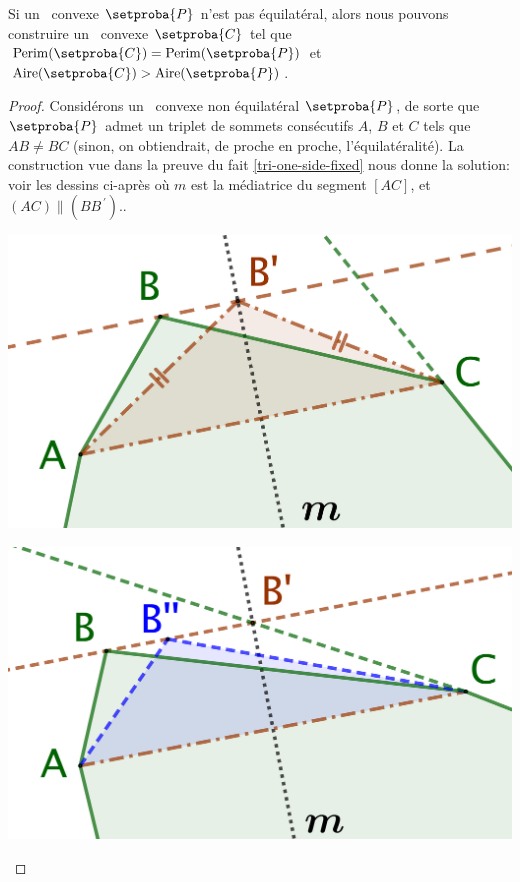 

\begin{fact} \label{must-be-equi}
	Si un \ngone\ convexe $\setproba{P}$ n'est pas équilatéral,
	alors nous pouvons construire un \ngone\ convexe $\setproba{C}$ tel que
	$\perim{\setproba{C}} = \perim{\setproba{P}}$
	et
	$\area{\setproba{C}} > \area{\setproba{P}}$.
\end{fact}


\begin{proof}
	Considérons un \ngone\ convexe non équilatéral $\setproba{P}$,
	de sorte que $\setproba{P}$ admet un triplet de sommets consécutifs $A$, $B$ et $C$ tels que $AB \neq BC$
	(sinon, on obtiendrait, de proche en proche, l'équilatéralité).
	La construction vue dans la preuve du fait \ref{tri-one-side-fixed} nous donne la solution: voir les dessins ci-après où 
	$m$ est la médiatrice du segment $[AC]$,
	et
	$(AC) \parallel (BB^{\,\prime})$..
	\begin{multicols}{2}
		\centering

		\includegraphics[scale=.35]{content/polygon/sol-must-be/not-iso-IN.png}

		\includegraphics[scale=.35]{content/polygon/sol-must-be/not-iso-BORDER.png}
	\end{multicols}



\end{proof}
